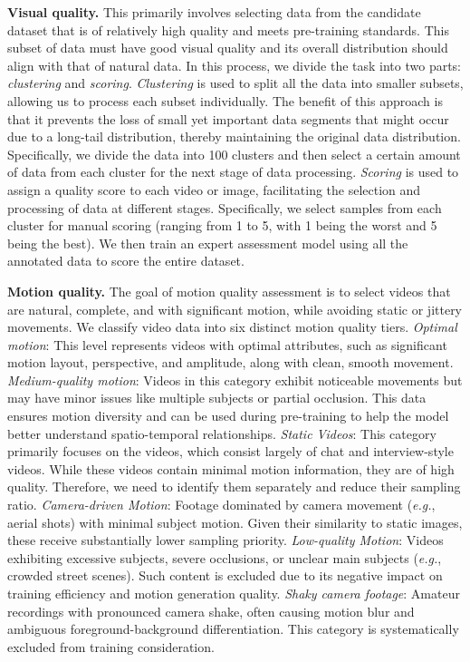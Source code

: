 \textbf{Visual quality.}  
%
This primarily involves selecting data from the candidate dataset that is of relatively high quality and meets pre-training standards.
%
This subset of data must have good visual quality and its overall distribution should align with that of natural data.
%
In this process, we divide the task into two parts: \emph{clustering} and \emph{scoring}. 
%
\emph{Clustering} is used to split all the data into smaller subsets, allowing us to process each subset individually. 
%
The benefit of this approach is that it prevents the loss of small yet important data segments that might occur due to a long-tail distribution, thereby maintaining the original data distribution. 
%
Specifically, we divide the data into 100 clusters and then select a certain amount of data from each cluster for the next stage of data processing.
%
\emph{Scoring} is used to assign a quality score to each video or image, facilitating the selection and processing of data at different stages. 
%
Specifically, we select samples from each cluster for manual scoring (ranging from 1 to 5, with 1 being the worst and 5 being the best). 
%
We then train an expert assessment model using all the annotated data to score the entire dataset. 

\textbf{Motion quality.}  
%
The goal of motion quality assessment is to select videos that are natural, complete, and with significant motion, while avoiding static or jittery movements. 
%
We classify video data into six distinct motion quality tiers.
%
\emph{Optimal motion}: This level represents videos with optimal attributes, such as significant motion layout, perspective, and amplitude, along with clean, smooth movement. 
%
\emph{Medium-quality motion}: Videos in this category exhibit noticeable movements but may have minor issues like multiple subjects or partial occlusion. This data ensures motion diversity and can be used during pre-training to help the model better understand spatio-temporal relationships. 
%
\emph{Static Videos}: This category primarily focuses on the videos, which consist largely of chat and interview-style videos. While these videos contain minimal motion information, they are of high quality. Therefore, we need to identify them separately and reduce their sampling ratio.
%
\emph{Camera-driven Motion}: Footage dominated by camera movement (\emph{e.g.}, aerial shots) with minimal subject motion. Given their similarity to static images, these receive substantially lower sampling priority.
%
\emph{Low-quality Motion}: Videos exhibiting excessive subjects, severe occlusions, or unclear main subjects (\emph{e.g.}, crowded street scenes). Such content is excluded due to its negative impact on training efficiency and motion generation quality.
%
\emph{Shaky camera footage}: Amateur recordings with pronounced camera shake, often causing motion blur and ambiguous foreground-background differentiation. This category is systematically excluded from training consideration.


